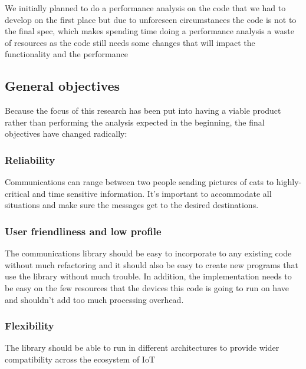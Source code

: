 We initially planned to do a performance analysis on the code that we had to develop on the first place but due to unforeseen circumstances the code is not to the final spec, which makes spending time doing a performance analysis a waste of resources as the code still needs some changes that will impact the functionality and the performance


\subsection{General objectives} \label{General objectives}
Because the focus of this research has been put into having a viable product rather than performing the analysis expected in the beginning, the final objectives have changed radically:
\subsubsection{Reliability}
Communications can range between two people sending pictures of cats to highly-critical and time sensitive information. It's important to accommodate all situations and make sure the messages get to the desired destinations.
\subsubsection{User friendliness and low profile}
The communications library should be easy to incorporate to any existing code without much refactoring and it should also be easy to create new programs that use the library without much trouble. In addition, the implementation needs to be easy on the few resources that the devices this code is going to run on have and shouldn't add too much processing overhead.
\subsubsection{Flexibility}
The library should be able to run in different architectures to provide wider compatibility across the ecosystem of IoT







	


